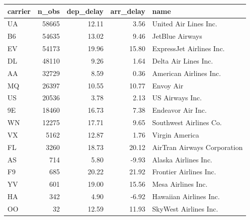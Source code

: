 \documentclass[]{book}
\newenvironment{Shaded}{\begin{snugshade}}{\end{snugshade}}
\newcommand{\KeywordTok}[1]{\textcolor[rgb]{0.13,0.29,0.53}{\textbf{{#1}}}}
\newcommand{\DataTypeTok}[1]{\textcolor[rgb]{0.13,0.29,0.53}{{#1}}}
\newcommand{\DecValTok}[1]{\textcolor[rgb]{0.00,0.00,0.81}{{#1}}}
\newcommand{\StringTok}[1]{\textcolor[rgb]{0.31,0.60,0.02}{{#1}}}
\newcommand{\OtherTok}[1]{\textcolor[rgb]{0.56,0.35,0.01}{{#1}}}
\newcommand{\NormalTok}[1]{{#1}}
\theoremstyle{definition}
\theoremstyle{definition}
\theoremstyle{remark}
\begin{document}
\begin{Shaded}
\end{Shaded}

\begin{tabular}{l|r|r|r|l}
\hline
carrier & n\_obs & dep\_delay & arr\_delay & name\\
\hline
UA & 58665 & 12.11 & 3.56 & United Air Lines Inc.\\
\hline
B6 & 54635 & 13.02 & 9.46 & JetBlue Airways\\
\hline
EV & 54173 & 19.96 & 15.80 & ExpressJet Airlines Inc.\\
\hline
DL & 48110 & 9.26 & 1.64 & Delta Air Lines Inc.\\
\hline
AA & 32729 & 8.59 & 0.36 & American Airlines Inc.\\
\hline
MQ & 26397 & 10.55 & 10.77 & Envoy Air\\
\hline
US & 20536 & 3.78 & 2.13 & US Airways Inc.\\
\hline
9E & 18460 & 16.73 & 7.38 & Endeavor Air Inc.\\
\hline
WN & 12275 & 17.71 & 9.65 & Southwest Airlines Co.\\
\hline
VX & 5162 & 12.87 & 1.76 & Virgin America\\
\hline
FL & 3260 & 18.73 & 20.12 & AirTran Airways Corporation\\
\hline
AS & 714 & 5.80 & -9.93 & Alaska Airlines Inc.\\
\hline
F9 & 685 & 20.22 & 21.92 & Frontier Airlines Inc.\\
\hline
YV & 601 & 19.00 & 15.56 & Mesa Airlines Inc.\\
\hline
HA & 342 & 4.90 & -6.92 & Hawaiian Airlines Inc.\\
\hline
OO & 32 & 12.59 & 11.93 & SkyWest Airlines Inc.\\
\hline
\end{tabular}
\end{document}

